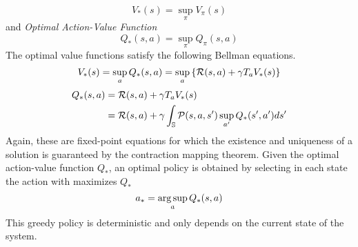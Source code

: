 \begin{equation}
	V_*(s) = \sup_\pi V_\pi(s)
\end{equation}
and \emph{Optimal Action-Value Function}
\begin{equation}
	Q_*(s,a) = \sup_\pi Q_\pi(s,a)
\end{equation}
The optimal value functions satisfy the following Bellman equations.
\begin{equation}
	V_*(s) = \sup_a Q_*(s,a) = \sup_a \left\{\mathcal{R}(s,a) + \gamma T_a V_*(s)\right\}
\end{equation}
\begin{equation}
	\begin{split}
		Q_*(s,a) &= \mathcal{R}(s,a) + \gamma T_a V_*(s)\\
			 &= \mathcal{R}(s,a) + \gamma \int_{\mathbb{S}} \mathcal{P}(s,a,s') \sup_{a'} Q_*(s', a') ds'
	\end{split}
\end{equation}
Again, these are fixed-point equations for which the existence and uniqueness of a solution is guaranteed by the contraction mapping theorem. Given the optimal action-value function $Q_*$, an optimal policy is obtained by selecting in each state the action with maximizes $Q_*$
\begin{equation}
	a_* = \operatorname*{arg\,sup}_a Q_*(s,a)
\end{equation}
This greedy policy is deterministic and only depends on the current state of the system.

